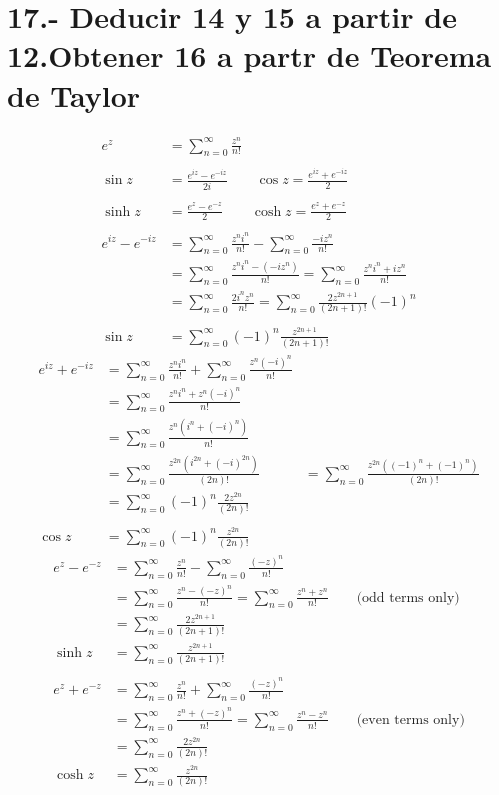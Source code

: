\documentclass{article}
\begin{document}
\section*{17.- Deducir 14 y 15 a partir de 12.Obtener 16 a partr de Teorema de Taylor  }
\begin{align*}
e^z &= \sum_{n=0}^{\infty} \frac{z^n}{n!} \\
\\
\sin z &= \frac{e^{iz} - e^{-iz}}{2i} \qquad \cos z = \frac{e^{iz} + e^{-iz}}{2} \\
\\
\sinh z &= \frac{e^z - e^{-z}}{2} \qquad \cosh z = \frac{e^z + e^{-z}}{2} \\
\\
e^{iz} - e^{-iz} &= \sum_{n=0}^{\infty} \frac{z^n i^n}{n!} - \sum_{n=0}^{\infty} \frac{-iz^n}{n!} \\
&= \sum_{n=0}^{\infty} \frac{z^n i^n - (-iz^n)}{n!} = \sum_{n=0}^{\infty} \frac{z^n i^n + iz^n}{n!} \\
&= \sum_{n=0}^{\infty} \frac{2i^n z^n}{n!} = \sum_{n=0}^{\infty} \frac{2z^{2n+1}}{(2n+1)!} (-1)^n \\
\\
\sin z &= \sum_{n=0}^{\infty} (-1)^n \frac{z^{2n+1}}{(2n+1)!}
\end{align*}
\begin{align*}
e^{iz} + e^{-iz} &= \sum_{n=0}^{\infty} \frac{z^n i^n}{n!} + \sum_{n=0}^{\infty} \frac{z^n (-i)^n}{n!} \\
&= \sum_{n=0}^{\infty} \frac{z^n i^n + z^n (-i)^n}{n!} \\
&= \sum_{n=0}^{\infty} \frac{z^n (i^n + (-i)^n)}{n!} \\
&= \sum_{n=0}^{\infty} \frac{z^{2n} (i^{2n} + (-i)^{2n})}{(2n)!}
&= \sum_{n=0}^{\infty} \frac{z^{2n} ((-1)^n + (-1)^n)}{(2n)!} \\
&= \sum_{n=0}^{\infty} (-1)^n \frac{2z^{2n}}{(2n)!} \\
\\
\cos z &= \sum_{n=0}^{\infty} (-1)^n \frac{z^{2n}}{(2n)!}
\end{align*}
\begin{align*}
e^z - e^{-z} &= \sum_{n=0}^{\infty} \frac{z^n}{n!} - \sum_{n=0}^{\infty} \frac{(-z)^n}{n!} \\
&= \sum_{n=0}^{\infty} \frac{z^n - (-z)^n}{n!} = \sum_{n=0}^{\infty} \frac{z^n + z^n}{n!} \qquad \text{(odd terms only)} \\
&= \sum_{n=0}^{\infty} \frac{2z^{2n+1}}{(2n+1)!} \\
\sinh z &= \sum_{n=0}^{\infty} \frac{z^{2n+1}}{(2n+1)!} \\
\\
e^z + e^{-z} &= \sum_{n=0}^{\infty} \frac{z^n}{n!} + \sum_{n=0}^{\infty} \frac{(-z)^n}{n!} \\
&= \sum_{n=0}^{\infty} \frac{z^n + (-z)^n}{n!} = \sum_{n=0}^{\infty} \frac{z^n - z^n}{n!} \qquad \text{(even terms only)} \\
&= \sum_{n=0}^{\infty} \frac{2z^{2n}}{(2n)!} \\
\cosh z &= \sum_{n=0}^{\infty} \frac{z^{2n}}{(2n)!}
\end{align*}
\end{document}
